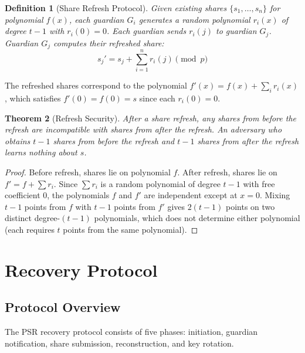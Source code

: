 \documentclass[11pt,a4paper,twocolumn]{article}
\newtheorem{theorem}{Theorem}[section]
\newtheorem{definition}[theorem]{Definition}
\begin{document}
\begin{definition}[Share Refresh Protocol]
Given existing shares $\{s_1, \ldots, s_n\}$ for polynomial $f(x)$, each guardian $G_i$ generates a random polynomial $r_i(x)$ of degree $t-1$ with $r_i(0) = 0$. Each guardian sends $r_i(j)$ to guardian $G_j$. Guardian $G_j$ computes their refreshed share:
\begin{equation}
  s_j' = s_j + \sum_{i=1}^{n} r_i(j) \pmod{p}
\end{equation}
\end{definition}

The refreshed shares correspond to the polynomial $f'(x) = f(x) + \sum_{i} r_i(x)$, which satisfies $f'(0) = f(0) = s$ since each $r_i(0) = 0$.

\begin{theorem}[Refresh Security]
After a share refresh, any shares from before the refresh are incompatible with shares from after the refresh. An adversary who obtains $t-1$ shares from before the refresh and $t-1$ shares from after the refresh learns nothing about $s$.
\end{theorem}

\begin{proof}
Before refresh, shares lie on polynomial $f$. After refresh, shares lie on $f' = f + \sum r_i$. Since $\sum r_i$ is a random polynomial of degree $t-1$ with free coefficient 0, the polynomials $f$ and $f'$ are independent except at $x = 0$. Mixing $t-1$ points from $f$ with $t-1$ points from $f'$ gives $2(t-1)$ points on two distinct degree-$(t-1)$ polynomials, which does not determine either polynomial (each requires $t$ points from the same polynomial).
\end{proof}

\section{Recovery Protocol}\label{sec:recovery}

\subsection{Protocol Overview}

The PSR recovery protocol consists of five phases: initiation, guardian notification, share submission, reconstruction, and key rotation.
\end{document}
